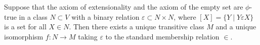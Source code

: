 Suppose that the axiom of extensionality and the axiom of the empty set are $\phi$-true in a class $N \subset V$ with a binary relation $\varepsilon \subset N \times N$, where $[X] = \{Y \mid Y \varepsilon X\}$ is a set for all $X \in N$. Then there exists a unique transitive class $M$ and a unique isomorphism $f: N \to M$ taking $\varepsilon$ to the standard membership relation $\in$.
